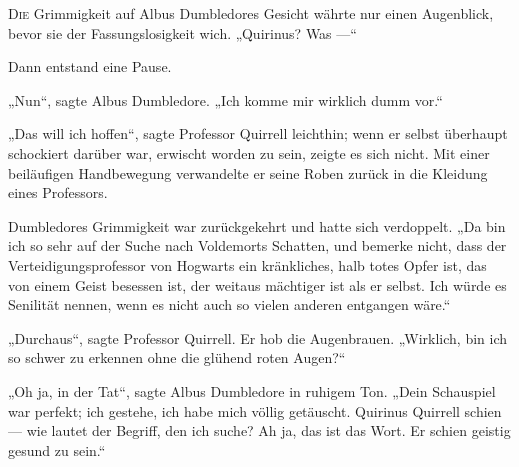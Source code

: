 
\lettrine{D}{ie} Grimmigkeit auf Albus Dumbledores Gesicht währte nur einen Augenblick, bevor sie der Fassungslosigkeit wich.
„Quirinus? Was —“

Dann entstand eine Pause.

„Nun“, sagte Albus Dumbledore.
„Ich komme mir wirklich dumm vor.“

„Das will ich hoffen“, sagte Professor Quirrell leichthin; wenn er selbst überhaupt schockiert darüber war, erwischt worden zu sein, zeigte es sich nicht. Mit einer beiläufigen Handbewegung verwandelte er seine Roben zurück in die Kleidung eines Professors.

Dumbledores Grimmigkeit war zurückgekehrt und hatte sich verdoppelt.
„Da bin ich so sehr auf der Suche nach Voldemorts Schatten, und bemerke nicht, dass der Verteidigungsprofessor von Hogwarts ein kränkliches, halb totes Opfer ist, das von einem Geist besessen ist, der weitaus mächtiger ist als er selbst. Ich würde es Senilität nennen, wenn es nicht auch so vielen anderen entgangen wäre.“

„Durchaus“, sagte Professor Quirrell. Er hob die Augenbrauen.
„Wirklich, bin ich so schwer zu erkennen ohne die glühend roten Augen?“

„Oh ja, in der Tat“, sagte Albus Dumbledore in ruhigem Ton.
„Dein Schauspiel war perfekt; ich gestehe, ich habe mich völlig getäuscht. Quirinus Quirrell schien — wie lautet der Begriff, den ich suche? Ah ja, das ist das Wort. Er schien geistig gesund zu sein.“

